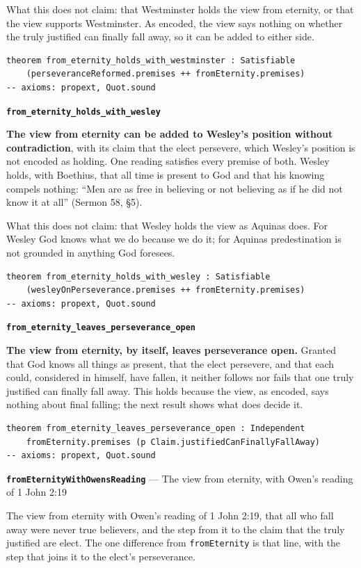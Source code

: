 \documentclass[11pt]{article}
\begin{document}
What this does not claim: that Westminster holds the view from eternity, or that the view supports Westminster. As encoded, the view says nothing on whether the truly justified can finally fall away, so it can be added to either side.

{\small\begin{verbatim}
theorem from_eternity_holds_with_westminster : Satisfiable
    (perseveranceReformed.premises ++ fromEternity.premises)
-- axioms: propext, Quot.sound
\end{verbatim}}
\par\medskip\noindent\textbf{\texttt{from\_\allowbreak{}eternity\_\allowbreak{}holds\_\allowbreak{}with\_\allowbreak{}wesley}}\par\nobreak\noindent
\textbf{The view from eternity can be added to Wesley’s position without contradiction}, with its claim that the elect persevere, which Wesley’s position is not encoded as holding. One reading satisfies every premise of both. Wesley holds, with Boethius, that all time is present to God and that his knowing compels nothing: “Men are as free in believing or not believing as if he did not know it at all” (Sermon 58, §5).

What this does not claim: that Wesley holds the view as Aquinas does. For Wesley God knows what we do because we do it; for Aquinas predestination is not grounded in anything God foresees.

{\small\begin{verbatim}
theorem from_eternity_holds_with_wesley : Satisfiable
    (wesleyOnPerseverance.premises ++ fromEternity.premises)
-- axioms: propext, Quot.sound
\end{verbatim}}
\par\medskip\noindent\textbf{\texttt{from\_\allowbreak{}eternity\_\allowbreak{}leaves\_\allowbreak{}perseverance\_\allowbreak{}open}}\par\nobreak\noindent
\textbf{The view from eternity, by itself, leaves perseverance open.} Granted that God knows all things as present, that the elect persevere, and that each could, considered in himself, have fallen, it neither follows nor fails that one truly justified can finally fall away. This holds because the view, as encoded, says nothing about final falling; the next result shows what does decide it.

{\small\begin{verbatim}
theorem from_eternity_leaves_perseverance_open : Independent
    fromEternity.premises (p Claim.justifiedCanFinallyFallAway)
-- axioms: propext, Quot.sound
\end{verbatim}}
\par\medskip\noindent\textbf{\texttt{from\allowbreak{}Eternity\allowbreak{}With\allowbreak{}Owens\allowbreak{}Reading}} --- The view from eternity, with Owen’s reading of 1 John 2:19\par\nobreak\noindent
The view from eternity with Owen’s reading of 1 John 2:19, that all who fall away were never true believers, and the step from it to the claim that the truly justified are elect. The one difference from \texttt{from\allowbreak{}Eternity} is that line, with the step that joins it to the elect’s perseverance.
\end{document}
